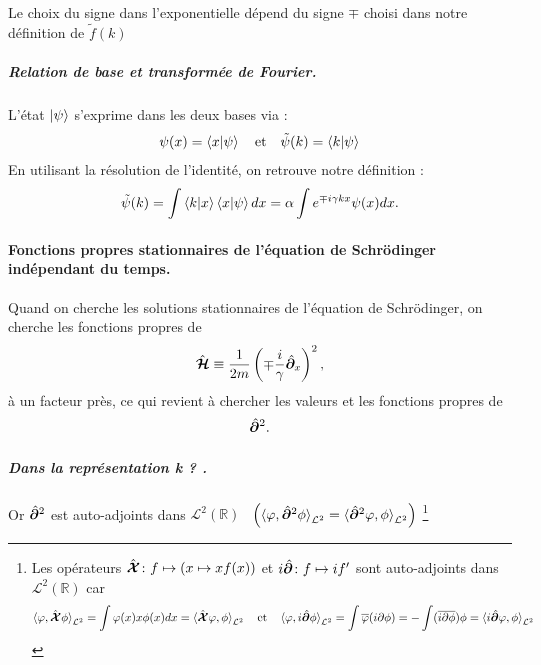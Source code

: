 \begin{NB}
    Le choix du signe dans l'exponentielle dépend du signe $\mp$ choisi dans notre définition de $\tilde{f}(k)$
\end{NB}

\subparagraph{Relation de base et transformée de Fourier.}
L'état $\ket{\psi}$ s'exprime dans les deux bases via :
\begin{eqnarray}
    \psi(x) = \braket{x | \psi} \quad \text{et} \quad \tilde{\psi}(k) = \braket{k | \psi}
\end{eqnarray}
En utilisant la résolution de l'identité, on retrouve notre définition :
\begin{eqnarray}
   \tilde{\psi}(k) = \int \braket{k | x} \braket{x | \psi} dx = \alpha \int e^{\mp i \gamma k x} \psi(x) dx.
\end{eqnarray}


\paragraph{Fonctions propres stationnaires de l'équation de Schrödinger indépendant du temps.}

Quand on cherche les solutions stationnaires de l'équation de  Schrödinger, on cherche les fonctions propres de 
\begin{eqnarray}
    \hat{\bm{\mathcal H}} \equiv \frac{1}{2m} \left ( \mp \frac{i}\gamma \hat{\bm{\partial}}_x \right )^2,
\end{eqnarray}
à un facteur près, ce qui revient à chercher les valeurs et les fonctions propres  de  
\begin{eqnarray}
    \hat{\bm{\partial}}^2.
\end{eqnarray}

\subparagraph{Dans la représentation \guillemotleft{}k\guillemotright{} ? .}

Or $\hat{\bm{\partial}}^2$ est auto-adjoints dans $\mathcal L^2(\mathbb R)$~ $\left (\braket{\varphi , \hat{\bm{\partial}}^2\phi }_{\mathcal L^2} = \braket{\hat{\bm{\partial}}^2 \varphi , \phi }_{\mathcal L^2}\right )$ \footnote{Les opérateurs $\hat{\bm{\mathcal X}} \colon f \mapsto ( x \mapsto xf(x))$ et $i \hat{\bm{\partial}} \colon f \mapsto i f'$ sont auto-adjoints dans $\mathcal L^2(\mathbb R)$ car $$\braket{ \varphi , \hat{\bm{\mathcal X}} \phi }_{\mathcal L^2} = \int \varphi(x) x \phi (x) dx = \braket{\hat{\bm{\mathcal X}}  \varphi ,  \phi }_{\mathcal L^2}  \quad \mbox{et} \quad \braket{ \varphi , i \hat{\bm{\partial}} \phi }_{\mathcal L^2} = \int \overline \varphi ( i \partial \phi ) = -  \int (\overline{  i \partial \phi }) \phi =  \braket{ i \hat{\bm{\partial}} \varphi ,  \phi }_{\mathcal L^2}$$  }

